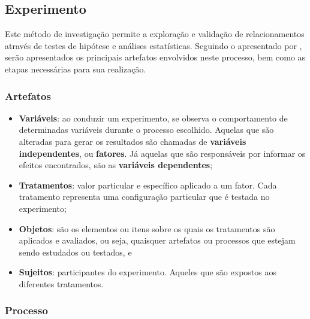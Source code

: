 \subsection{Experimento}

Este método de investigação permite a exploração e validação de relacionamentos através de testes de hipótese e análises estatísticas. Seguindo o apresentado por , serão apresentados os principais artefatos envolvidos neste processo, bem como as etapas necessárias para sua realização.

\subsubsection{Artefatos}

\begin{itemize}
    \item \textbf{Variáveis}: ao conduzir um experimento, se observa o comportamento de determinadas variáveis durante o processo escolhido. Aquelas que são alteradas para gerar os resultados são chamadas de \textbf{variáveis independentes}, ou \textbf{fatores}. Já aquelas que são responsáveis por informar os efeitos encontrados, são as \textbf{variáveis dependentes};
    \item \textbf{Tratamentos}: valor particular e específico aplicado a um fator. Cada tratamento representa uma configuração particular que é testada no experimento;
    \item \textbf{Objetos}: são os elementos ou itens sobre os quais os tratamentos são aplicados e avaliados, ou seja, quaisquer artefatos ou processos que estejam sendo estudados ou testados, e
    \item \textbf{Sujeitos}: participantes do experimento. Aqueles que são expostos aos diferentes tratamentos.
\end{itemize}

\subsubsection{Processo}

